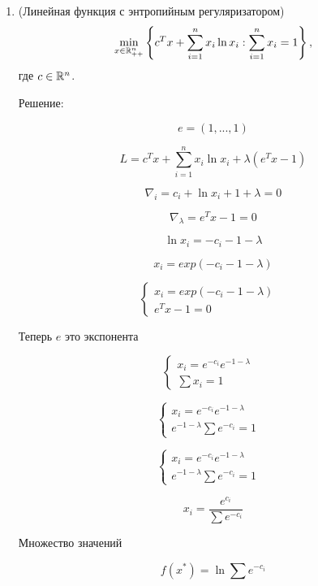 \documentclass{article}
\begin{document}
\begin{enumerate}[label=\textbf{\arabic*}, leftmargin=0em]
\begin{enumerate}
\item (Линейная функция с энтропийным регуляризатором)
\begin{equation}
\min_{x \in \mathbb{R}^n_{++}} \left\{ c^T x + \sum_{i=1}^n x_i \ln x_i : \sum_{i=1}^n x_i = 1 \right\},
\end{equation}
где $c \in \mathbb{R}^n$.

Решение:

$$
e = (1,...,1)
$$

$$
L =  c^T x + \sum_{i=1}^n x_i \ln x_i + \lambda(e^Tx - 1)
$$

$$
\nabla_i = c_i + \ln x_i + 1 + \lambda = 0
$$

$$
\nabla_{\lambda} = e^Tx - 1 = 0
$$

$$
\ln x_i = - c_i - 1 - \lambda
$$

$$
x_i = exp(- c_i - 1 - \lambda)
$$

$$
\begin{cases}
x_i = exp(- c_i - 1 - \lambda) &\\
e^Tx - 1 = 0
\end{cases}
$$

Теперь $e$ это экспонента

$$
\begin{cases}
x_i = e^{-c_i} e^{- 1 - \lambda} &\\
\sum x_i = 1
\end{cases}
$$

$$
\begin{cases}
x_i = e^{-c_i} e^{- 1 - \lambda} &\\
e^{- 1 - \lambda} \sum e^{-c_i} = 1
\end{cases}
$$


$$
\begin{cases}
x_i = e^{-c_i} e^{- 1 - \lambda} &\\
e^{- 1 - \lambda} \sum e^{-c_i} = 1
\end{cases}
$$


$$
x_i = \frac{e^{c_i}}{\sum e^{-c_i}}
$$

Множество значений

$$
f(x^*) = \ln \sum e^{-c_i}
$$



\end{enumerate}
\end{enumerate}
\end{document}
